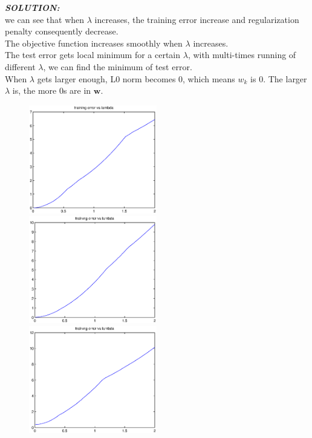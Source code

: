 \documentclass{article}
\theoremstyle{definition}
\theoremstyle{definition}
\theoremstyle{remark}
\begin{document}
\emph{\textbf{SOLUTION:}}\\
we can see that when $\lambda$ increases, the training error increase and regularization penalty consequently decrease.\\
The objective function increases smoothly when $\lambda$ increases.\\
The test error gets local minimum for a certain $\lambda$, with multi-times running of different $\lambda$, we can find the minimum of test error.\\
When $\lambda$ gets larger enough, L0 norm becomes 0, which means $w_k$ is 0. The larger $\lambda$ is, the more 0s are in $\mathbf{w}$.
\begin{figure}[!htbp]
\begin{minipage}[t]{0.3\linewidth}
\centering
\includegraphics[width=2.2in]{s1.eps}
\end{minipage}%
\begin{minipage}[t]{0.3\linewidth}
\centering
\includegraphics[width=2.2in]{m1.eps}
\end{minipage}
\begin{minipage}[t]{0.3\linewidth}
\centering
\includegraphics[width=2.2in]{l1.eps}
\end{minipage}
\end{figure}
\end{document}

